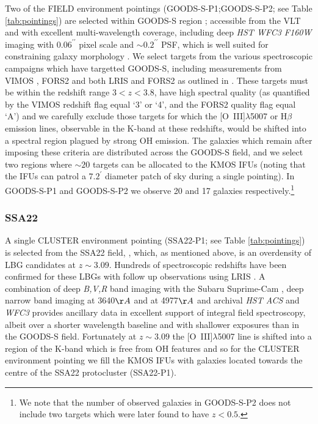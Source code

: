 \documentclass[fleqn,usenatbib]{mn2e}
\begin{document}
Two of the FIELD environment pointings (GOODS-S-P1;GOODS-S-P2; see Table \ref{tab:pointings}) are selected within GOODS-S region \citep{Guo2013}; accessible from the VLT and with excellent multi-wavelength coverage, including deep {\em HST WFC3 F160W} imaging with $ 0.06^{\prime\prime}$ pixel scale and $ \sim 0.2^{\prime\prime}$ PSF, which is well suited for constraining galaxy morphology \citep{Grogin2011,Koekemoer2011}.
We select targets from the various spectroscopic campaigns which have targetted GOODS-S, including measurements from VIMOS \citep{Balestra2010,Cassata2014}, FORS2 \citep{Vanzella2005,Vanzella2006,Vanzella2008} and both LRIS and FORS2 as outlined in \cite{Wuyts2009}.
These targets must be within the redshift range $3 < z < 3.8$, have high spectral quality (as quantified by the VIMOS redshift flag equal `3' or `4', and the FORS2 quality flag equal `A') and we carefully exclude those targets for which the [O~{\sc III}]$\lambda$5007 or H$\beta$ emission lines, observable in the K-band at these redshifts, would be shifted into a spectral region plagued by strong OH emission.
The galaxies which remain after imposing these criteria are distributed across the GOODS-S field, and we select two regions where $\sim 20$ targets can be allocated to the KMOS IFUs (noting that the IFUs can patrol a $7.2^{\prime}$ diameter patch of sky during a single pointing).
In GOODS-S-P1 and GOODS-S-P2 we observe 20 and 17 galaxies respectively.\footnote{We note that the number of observed galaxies in GOODS-S-P2 does not include two targets which were later found to have $z < 0.5$.}

\subsubsection{SSA22}\label{subsubsec:sample_selection_ssa}
A single CLUSTER environment pointing (SSA22-P1; see Table \ref{tab:pointings}) is selected from the SSA22 field, \citep{Steidel1998,Steidel2000,Steidel2003,Shapley2003}, which, as mentioned above, is an overdensity of LBG candidates at $z \sim 3.09$.
Hundreds of spectroscopic redshifts have been confirmed for these LBGs with follow up observations using LRIS \citep{Shapley2003,Nestor2013}.
A combination of deep {\em B,V,R} band imaging with the Subaru Suprime-Cam \citep{Matsuda2004}, deep narrow band imaging at 3640$\AA$ \citep{Matsuda2004} and at 4977$\AA$ \citep{Nestor2011,Yamada2012a} and archival {\em HST ACS} and {\it WFC3} provides ancillary data in excellent support of integral field spectroscopy, albeit over a shorter wavelength baseline and with shallower exposures than in the GOODS-S field.
Fortunately at $z \sim 3.09$ the [O~{\sc III}]$\lambda$5007 line is shifted into a region of the K-band which is free from OH features and so for the CLUSTER environment pointing we fill the KMOS IFUs with galaxies located towards the centre of the SSA22 protocluster (SSA22-P1).
\end{document}
